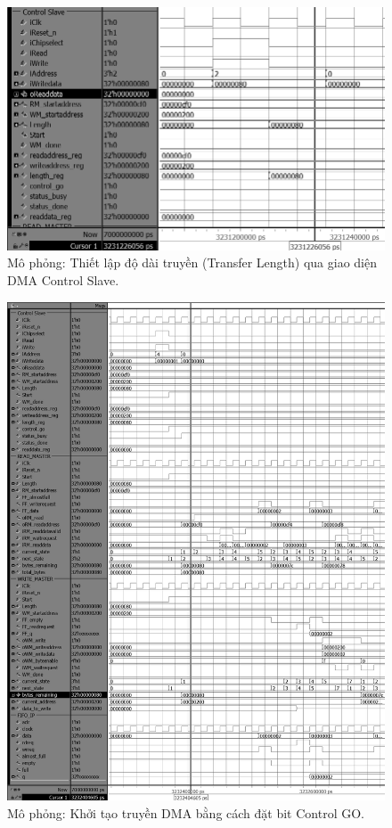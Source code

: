 \begin{figure}[htbp]
    \centering
    \includegraphics[width=0.8\linewidth]{Images/04_03_ControlSlave_Write_Length.png} %
    \caption{Mô phỏng: Thiết lập độ dài truyền (Transfer Length) qua giao diện DMA Control Slave.}
    \label{fig:04_03_ControlSlave_Write_Length}
\end{figure}

\begin{figure}[htbp]
    \centering
    \includegraphics[width=\linewidth]{Images/04_04_DMA_Start_control_go.png}
    \caption{Mô phỏng: Khởi tạo truyền DMA bằng cách đặt bit Control GO.}
    \label{fig:04_04_DMA_Start_control_go}
\end{figure}


